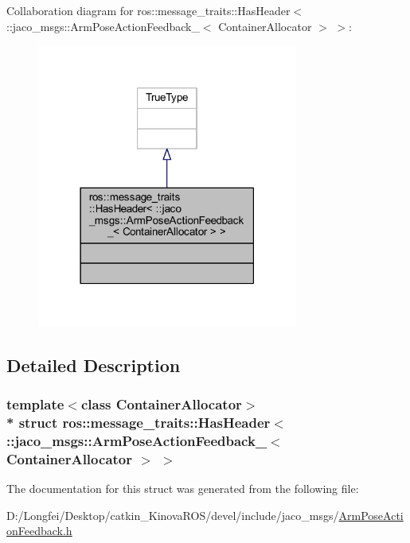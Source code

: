 Collaboration diagram for ros\+:\+:message\+\_\+traits\+:\+:Has\+Header$<$ \+:\+:jaco\+\_\+msgs\+:\+:Arm\+Pose\+Action\+Feedback\+\_\+$<$ Container\+Allocator $>$ $>$\+:
\nopagebreak
\begin{figure}[H]
\begin{center}
\leavevmode
\includegraphics[width=243pt]{d7/d89/structros_1_1message__traits_1_1HasHeader_3_01_1_1jaco__msgs_1_1ArmPoseActionFeedback___3_01Cont82d920eac3d7a6e024196bdfabed18b6}
\end{center}
\end{figure}


\subsection{Detailed Description}
\subsubsection*{template$<$class Container\+Allocator$>$\\*
struct ros\+::message\+\_\+traits\+::\+Has\+Header$<$ \+::jaco\+\_\+msgs\+::\+Arm\+Pose\+Action\+Feedback\+\_\+$<$ Container\+Allocator $>$ $>$}



The documentation for this struct was generated from the following file\+:\begin{DoxyCompactItemize}
\item 
D\+:/\+Longfei/\+Desktop/catkin\+\_\+\+Kinova\+R\+O\+S/devel/include/jaco\+\_\+msgs/\hyperlink{ArmPoseActionFeedback_8h}{Arm\+Pose\+Action\+Feedback.\+h}\end{DoxyCompactItemize}
